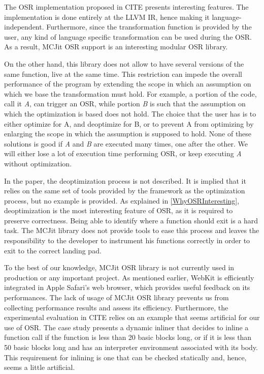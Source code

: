 The OSR implementation proposed in CITE presents interesting features.
The implementation is done entirely at the LLVM IR, hence making it language-independent.
Furthermore, since the transformation function is provided by the user, any kind of language specific transformation can be used during the OSR.
As a result, MCJit OSR support is an interesting modular OSR library.

On the other hand, this library does not allow to have several versions of the same function, live at the same time.
This restriction can impede the overall performance of the program by extending the scope in which an assumption on which we base the transformation must hold.
For example, a portion of the code, call it \textit{A}, can trigger an OSR, while portion \textit{B} is such that the assumption on which the optimization is based does not hold.
The choice that the user has is to either optimize for A, and deoptimize for B, or to prevent A from optimizing by enlarging the scope in which the assumption is supposed to hold.
None of these solutions is good if \textit{A} and \textit{B} are executed many times, one after the other.
We will either lose a lot of execution time performing OSR, or keep executing \textit{A} without optimization.

In the paper, the deoptimization process is not described. 
It is implied that it relies on the same set of tools provided by the framework as the optimization process, but no example is provided.
As explained in \ref{WhyOSRInteresting}, deoptimization is the most interesting feature of OSR, as it is required to preserve correctness.
Being able to identify where a function should exit is a hard task.
The MCJit library does not provide tools to ease this process and leaves the responsibility to the developer to instrument his functions correctly in order to exit to the correct landing pad.

To the best of our knowledge, MCJit OSR library is not currently used in production or any important project.
As mentioned earlier, WebKit is efficiently integrated in Apple Safari's web browser, which provides useful feedback on its performances.
The lack of usage of MCJit OSR library prevents us from collecting performance results and assess its efficiency.
Furthermore, the experimental evaluation in CITE relies on an example that seems artificial for our use of OSR. 
The case study presents a dynamic inliner that decides to inline a function call if the function is less than 20 basic blocks long, or if it is less than 50 basic blocks long and has an interpreter environment associated with its body. 
This requirement for inlining is one that can be checked statically and, hence, seems a little artificial.\\

